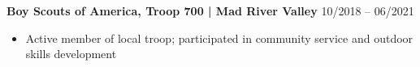 \noindent
\textbf{Boy Scouts of America, Troop 700 | Mad River Valley} \hfill 10/2018 -- 06/2021
\begin{itemize}
    \item Active member of local troop; participated in community service and outdoor skills development
\end{itemize}
